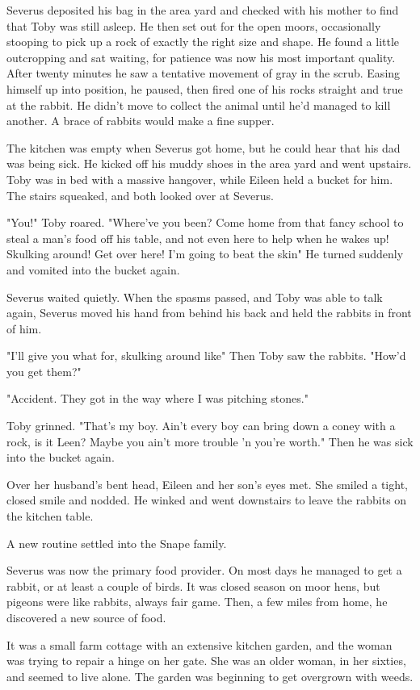 Severus deposited his bag in the area yard and checked with his mother to find that Toby was still asleep. He then set out for the open moors, occasionally stooping to pick up a rock of exactly the right size and shape. He found a little outcropping and sat waiting, for patience was now his most important quality. After twenty minutes he saw a tentative movement of gray in the scrub. Easing himself up into position, he paused, then fired one of his rocks straight and true at the rabbit. He didn't move to collect the animal until he'd managed to kill another. A brace of rabbits would make a fine supper.

The kitchen was empty when Severus got home, but he could hear that his dad was being sick. He kicked off his muddy shoes in the area yard and went upstairs. Toby was in bed with a massive hangover, while Eileen held a bucket for him. The stairs squeaked, and both looked over at Severus.

"You!" Toby roared. "Where've you been? Come home from that fancy school to steal a man's food off his table, and not even here to help when he wakes up! Skulking around! Get over here! I'm going to beat the skin{\el}" He turned suddenly and vomited into the bucket again.

Severus waited quietly. When the spasms passed, and Toby was able to talk again, Severus moved his hand from behind his back and held the rabbits in front of him.

"I'll give you what for, skulking around like{\el}" Then Toby saw the rabbits. "How'd you get them?"

"Accident. They got in the way where I was pitching stones."

Toby grinned. "That's my boy. Ain't every boy can bring down a coney with a rock, is it Leen? Maybe you ain't more trouble 'n you're worth." Then he was sick into the bucket again.

Over her husband's bent head, Eileen and her son's eyes met. She smiled a tight, closed smile and nodded. He winked and went downstairs to leave the rabbits on the kitchen table.

A new routine settled into the Snape family.

Severus was now the primary food provider. On most days he managed to get a rabbit, or at least a couple of birds. It was closed season on moor hens, but pigeons were like rabbits, always fair game. Then, a few miles from home, he discovered a new source of food.

It was a small farm cottage with an extensive kitchen garden, and the woman was trying to repair a hinge on her gate. She was an older woman, in her sixties, and seemed to live alone. The garden was beginning to get overgrown with weeds.

